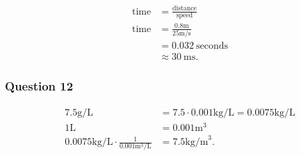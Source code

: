 \begin{solution}
	\begin{align*}
		\text{time} &= \frac{\text{distance}}{\text{speed}} \\
		\text{time} &= \frac{0.8\text{m}}{25\text{m/s}} \\
		&= 0.032~\text{seconds} \\
		&\approx 30~\text{ms}
	.\end{align*}
\end{solution}

\subsubsection{Question 12}

\vspace{1em}

\begin{solution}
	\begin{align*}
		7.5\text{g/L} &= 7.5 \cdot 0.001 \text{kg/L} = 0.0075 \text{kg/L} \\
		1\text{L} &= 0.001\text{m}^3 \\
		0.0075\text{kg/L} \cdot \frac{1}{0.001\text{m}^3\text{/L}} &= 7.5\text{kg/m}^3
	.\end{align*}
\end{solution}
